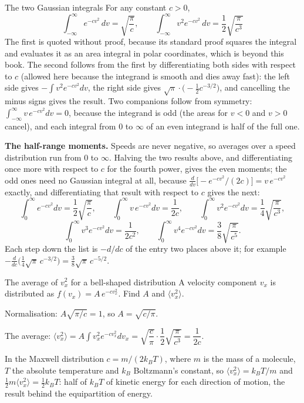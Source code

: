 \begin{keybox}{The two Gaussian integrals}
For any constant $c>0$,
\[
\boxed{\;\int_{-\infty}^{\infty}e^{-cv^2}\,dv=\sqrt{\frac{\pi}{c}},\qquad
\int_{-\infty}^{\infty}v^{2}e^{-cv^2}\,dv=\frac12\sqrt{\frac{\pi}{c^{3}}}\;}
\]
The first is quoted without proof, because its standard proof squares the integral and evaluates it as
an area integral in polar coordinates, which is beyond this book. The second follows from the first by
differentiating both sides with respect to $c$ (allowed here because the integrand is smooth and dies
away fast): the left side gives $-\int v^2e^{-cv^2}dv$, the right side gives
$\sqrt\pi\cdot\big(-\tfrac12c^{-3/2}\big)$, and cancelling the minus signs gives the result. Two
companions follow from symmetry: $\int_{-\infty}^{\infty}v\,e^{-cv^2}dv=0$, because the integrand is odd
(the areas for $v<0$ and $v>0$ cancel), and each integral from $0$ to $\infty$ of an even integrand is
half of the full one.

\textbf{The half-range moments.} Speeds are never negative, so averages over a speed distribution run from
$0$ to $\infty$. Halving the two results above, and differentiating once more with respect to $c$ for the
fourth power, gives the even moments; the odd ones need no Gaussian integral at all, because
$\frac{d}{dv}\big[-e^{-cv^2}/(2c)\big]=v\,e^{-cv^2}$ exactly, and differentiating that result with respect to
$c$ gives the next:
\[
\int_0^{\infty}e^{-cv^2}dv=\frac12\sqrt{\frac{\pi}{c}},\qquad
\int_0^{\infty}v\,e^{-cv^2}dv=\frac{1}{2c},\qquad
\int_0^{\infty}v^{2}e^{-cv^2}dv=\frac14\sqrt{\frac{\pi}{c^{3}}},
\]
\[
\int_0^{\infty}v^{3}e^{-cv^2}dv=\frac{1}{2c^{2}},\qquad
\int_0^{\infty}v^{4}e^{-cv^2}dv=\frac38\sqrt{\frac{\pi}{c^{5}}}.
\]
Each step down the list is $-d/dc$ of the entry two places above it; for example
$-\frac{d}{dc}\big(\tfrac14\sqrt\pi\,c^{-3/2}\big)=\tfrac38\sqrt\pi\,c^{-5/2}$.
\end{keybox}

\begin{exbox}{The average of $v_x^2$ for a bell-shaped distribution}
A velocity component $v_x$ is distributed as $f(v_x)=A\,e^{-cv_x^2}$. Find $A$ and $\langle v_x^2\rangle$.

 Normalisation: $A\sqrt{\pi/c}=1$, so $A=\sqrt{c/\pi}$.

 The average: $\langle v_x^2\rangle=A\int v_x^2e^{-cv_x^2}dv_x=\sqrt{\dfrac{c}{\pi}}\cdot
\dfrac12\sqrt{\dfrac{\pi}{c^{3}}}=\dfrac{1}{2c}$.

 In the Maxwell distribution $c=m/(2k_BT)$, where $m$ is the mass of a molecule, $T$ the
absolute temperature and $k_B$ Boltzmann's constant, so $\langle v_x^2\rangle=k_BT/m$ and
$\tfrac12m\langle v_x^2\rangle=\tfrac12k_BT$: half of $k_BT$ of kinetic energy for each direction of
motion, the result behind the equipartition of energy.
\end{exbox}

